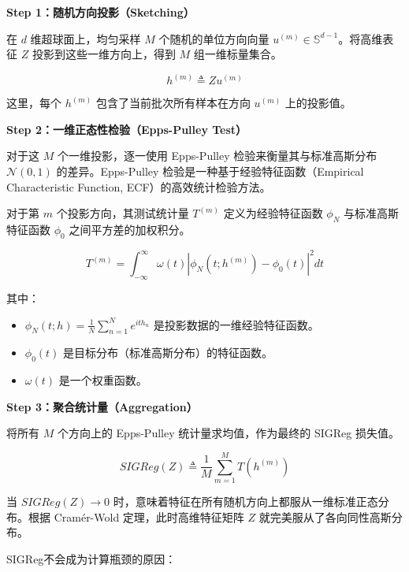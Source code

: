 \textbf{Step 1：随机方向投影（Sketching）}

在 \(d\) 维超球面上，均匀采样 \(M\) 个随机的单位方向向量 \(u^{(m)} \in \mathbb{S}^{d-1}\)。将高维表征 \(Z\) 投影到这些一维方向上，得到 \(M\) 组一维标量集合。

\[
h^{(m)} \triangleq Zu^{(m)}
\]

这里，每个 \(h^{(m)}\) 包含了当前批次所有样本在方向 \(u^{(m)}\) 上的投影值。

\textbf{Step 2：一维正态性检验（Epps-Pulley Test）}

对于这 \(M\) 个一维投影，逐一使用 Epps-Pulley 检验来衡量其与标准高斯分布 \(\mathcal{N}(0,1)\) 的差异。Epps-Pulley 检验是一种基于经验特征函数（Empirical Characteristic Function, ECF）的高效统计检验方法。

对于第 \(m\) 个投影方向，其测试统计量 \(T^{(m)}\) 定义为经验特征函数 \(\phi_N\) 与标准高斯特征函数 \(\phi_0\) 之间平方差的加权积分。

\[
T^{(m)} = \int_{-\infty}^{\infty} \omega(t)\left|\phi_N(t;h^{(m)}) - \phi_0(t)\right|^2 dt
\]

其中：

\begin{itemize}
\tightlist
\item
  \(\phi_N(t;h)=\frac{1}{N}\sum_{n=1}^{N} e^{ith_n}\) 是投影数据的一维经验特征函数。
\item
  \(\phi_0(t)\) 是目标分布（标准高斯分布）的特征函数。
\item
  \(\omega(t)\) 是一个权重函数。
\end{itemize}

\textbf{Step 3：聚合统计量（Aggregation）}

将所有 \(M\) 个方向上的 Epps-Pulley 统计量求均值，作为最终的 SIGReg 损失值。

\[
SIGReg(Z) \triangleq \frac{1}{M}\sum_{m=1}^{M}T(h^{(m)})
\]

当 \(SIGReg(Z)\to 0\) 时，意味着特征在所有随机方向上都服从一维标准正态分布。根据 Cramér-Wold 定理，此时高维特征矩阵 \(Z\) 就完美服从了各向同性高斯分布。

SIGReg不会成为计算瓶颈的原因：

